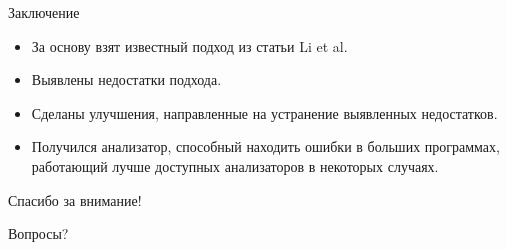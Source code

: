 \documentclass[russian, hyperref={unicode}]{beamer}
\begin{document}
\begin{frame}{Заключение}
    \begin{itemize}
        \item За основу взят известный подход из статьи Li et al.
        \item Выявлены недостатки подхода.
        \item Сделаны улучшения, направленные на устранение выявленных
          недостатков.
        \item Получился анализатор, способный находить
          ошибки в больших программах, работающий лучше доступных
          анализаторов в некоторых случаях.
    \end{itemize}
\end{frame}

\begin{frame}{Спасибо за внимание!}
    \begin{center}
        \Huge
        {\color{blue} Вопросы?}
    \end{center}
\end{frame}


\end{document}
